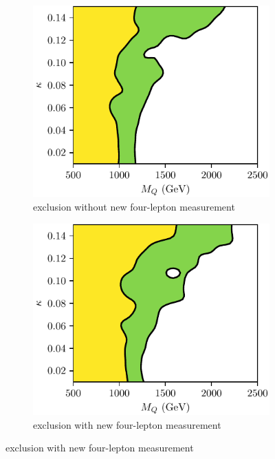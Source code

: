\begin{figure}[htb]
    \begin{subfigure}{.45\textwidth}\centering
      \includegraphics[width=.99\linewidth]{Figures/VLQ/newm4l/1gen-old-ATLAS_13_4LLevels.pdf} \caption{\contur exclusion without new four-lepton measurement}\label{fig:gen1:4lold}
    \end{subfigure}
        \begin{subfigure}{.45\textwidth}\centering
      \includegraphics[width=.99\linewidth]{Figures/VLQ/newm4l/1gen-ATLAS_13_4LLevels.pdf}\caption{\contur exclusion with new four-lepton measurement}\label{fig:gen1:4lnew}
    \end{subfigure}
    \label{fig:gen1:4l}
\end{figure}

